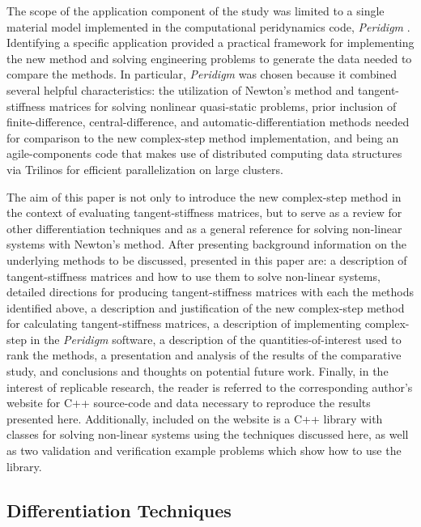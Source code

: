 \documentclass[preprint,12pt]{elsarticle}
\begin{document}
The scope of the application component of the study was limited to a single material model implemented in the computational peridynamics code, \textit{Peridigm} \cite{peridigm}. Identifying a specific application provided a practical framework for implementing the new method and solving engineering problems to generate the data needed to compare the methods. In particular, \emph{Peridigm} was chosen because it combined several helpful characteristics: the utilization of Newton's method and tangent-stiffness matrices for solving nonlinear quasi-static problems, prior inclusion of finite-difference, central-difference, and automatic-differentiation methods needed for comparison to the new complex-step method implementation, and being an agile-components code that makes use of distributed computing data structures via Trilinos \cite{trilinos} for efficient parallelization on large clusters.

The aim of this paper is not only to introduce the new complex-step method in the context of evaluating tangent-stiffness matrices, but to serve as a review for other differentiation techniques and as a general reference for solving non-linear systems with Newton's method. After presenting background information on the underlying methods to be discussed, presented in this paper are: a description of tangent-stiffness matrices and how to use them to solve non-linear systems, detailed directions for producing tangent-stiffness matrices with each the methods identified above, a description and justification of the new complex-step method for calculating tangent-stiffness matrices, a description of implementing complex-step in the \emph{Peridigm} software, a description of the quantities-of-interest used to rank the methods, a presentation and analysis of the results of the comparative study, and conclusions and thoughts on potential future work. Finally, in the interest of replicable research, the reader is referred to the corresponding author's website for C++ source-code and data necessary to reproduce the results presented here. Additionally, included on the website is a C++ library with classes for solving non-linear systems using the techniques discussed here, as well as two validation and verification example problems which show how to use the library.

\subsection{Differentiation Techniques}
\end{document}
